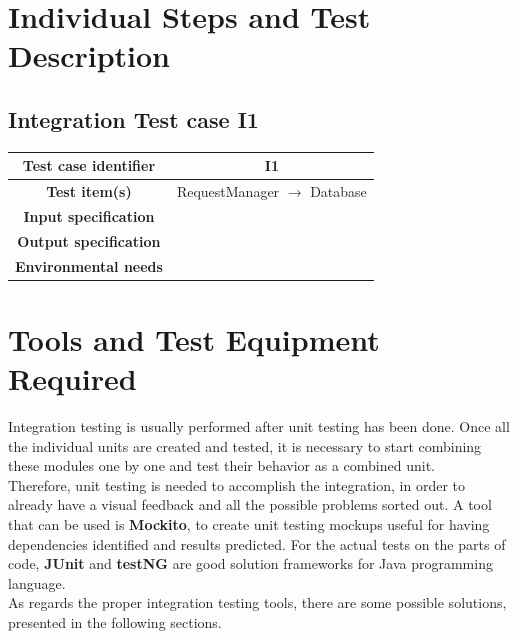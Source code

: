 \documentclass[18pt,oneside,a4paper, titlepage]{article}
\begin{document}
\newpage
\section{Individual	Steps	and	Test	Description}
	\hypertarget{chapter 3.1}{ }
	\subsection{Integration Test case I1}
	\begin{center}
		\centering
		
		\begin{tabular}{| c| c|}
			\hline 		\textbf{Test case identifier} & I1 \\
			\hline		\textbf{Test item(s)}  & RequestManager $\rightarrow$ Database \\
			\hline		\textbf{Input specification} & \\
			\hline		\textbf{Output specification} & \\
			\hline		\textbf{Environmental needs} & \\
			\hline
			\end{tabular}
			\end{center}

\newpage
\section{Tools	and	Test	Equipment	Required}
	Integration testing is usually performed after unit testing has been done.  Once all the individual units are created and tested, it is necessary to start combining these modules one by one and test their behavior as a combined unit.\\
	Therefore, unit testing is needed to accomplish the integration, in order to already have a visual feedback and all the possible problems sorted out. A tool that can be used is \textbf{Mockito}, to create unit testing mockups useful for having dependencies identified and results predicted. For the actual tests on the parts of code, \textbf{JUnit} and \textbf{testNG} are good solution frameworks for Java programming language.\\
	As regards the proper integration testing tools, there are some possible solutions, presented in the following sections.
	
\end{document}
